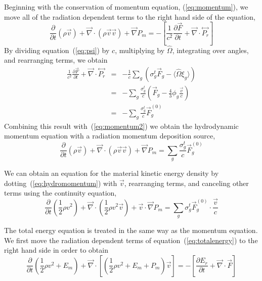 \documentclass{article}
\newcommand{\partl}[2]{\ensuremath{\frac{\partial{#1}}{\partial{#2}}}}\newcommand{\del}{\ensuremath{\vec{\nabla}}}
\newcommand{\tensor}[1]{\ensuremath{\stackrel{\leftrightarrow}{#1}}}
\begin{document}
Beginning with the conservation of momentum equation, (\ref{eq:momentum}),
we move all of the radiation dependent terms to the right hand side of the
equation,
\begin{equation}
   \partl{}{t}\left( \rho \vec{v}\right)
      + \del \cdot \left( \rho \vec{v} \vec{v} \right)
      + \del P_{m}
   =
   - \left[ \frac{1}{c^2} \partl{\vec{F}}{t}
            + \del \cdot \tensor{P_{r}}
     \right]
\label{eq:momentum2}
\end{equation}
By dividing equation~(\ref{eq:psi}) by $c$, multiplying by $\hat{\Omega}$,
integrating over angles, and rearranging terms, we obtain
\begin{eqnarray}
   \frac{1}{c^2} \partl{\vec{F}}{t} + \del \cdot \tensor{P_{r}}
      &=& - \frac{1}{c} \sum_{g} \left( \sigma^{t}_{g} \vec{F}_{g}
                              - \langle \hat{\Omega} \xi_{g} \rangle \right)
         \\
      &=& - \sum_{g} \frac{\sigma^{t}_{g}}{c}
             \left( \vec{F}_{g} - \frac{4}{3} \phi_{g} \frac{\vec{v}}{c} \right)
         \\
      &=& - \sum_{g} \frac{\sigma^{t}_{g}}{c} \vec{F}^{(0)}_{g}
\end{eqnarray}
Combining this result with~(\ref{eq:momentum2}) we obtain the hydrodynamic
momentum equation with a radiation momentum deposition source,
\begin{equation}
 \boxed{
   \partl{}{t}\left( \rho \vec{v}\right)
      + \del \cdot \left( \rho \vec{v} \vec{v} \right)
      + \del P_{m}
   =
    \sum_{g} \frac{\sigma^{t}_{g}}{c} \vec{F}^{(0)}_{g}
 }
\label{eq:hydromomentum}
\end{equation}

We can obtain an equation for the material kinetic energy density by
dotting~(\ref{eq:hydromomentum}) with $\vec{v}$, rearranging terms, and
canceling other terms using the continuity equation,
\begin{equation}
     \partl{}{t} \left(\frac{1}{2} \rho v^2\right)
   + \del \cdot \left(\frac{1}{2} \rho v^2 \vec{v} \right)
   + \vec{v} \cdot \del P_{m}
   = \sum_{g} \sigma^{t}_{g} \vec{F}^{(0)}_{g} \cdot \frac{\vec{v}}{c}
\label{eq:hydrokinetic}
\end{equation}

The total energy equation is treated in the same way as the
momentum equation.
We first move the radiation dependent terms of equation~(\ref{eq:totalenergy})
to the right hand side in order to obtain
\begin{equation}
	\partl{}{t}\left( \frac{1}{2} \rho v^2
                          + E_{m}\right)
	 + \del \cdot \left[
              \left( \frac{1}{2} \rho v^2 + E_{m} + P_{m} \right) \vec{v}
                      \right]
    =
	- \left[ \partl{E_{r}}{t} + \del \cdot \vec{F} \right]
\label{eq:totalenergy2}
\end{equation}
\end{document}
